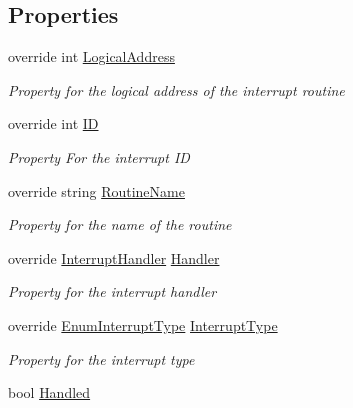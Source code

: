 \subsection*{Properties}
\begin{DoxyCompactItemize}
\item 
override int \hyperlink{class_c_p_u___o_s___simulator_1_1_c_p_u_1_1_interrupts_1_1_vectored_interrupt_aabc866e723b3484d03f7a5eac790a3ce}{Logical\+Address}
\begin{DoxyCompactList}\small\item\em Property for the logical address of the interrupt routine \end{DoxyCompactList}\item 
override int \hyperlink{class_c_p_u___o_s___simulator_1_1_c_p_u_1_1_interrupts_1_1_vectored_interrupt_ae6afd6b3fba35d485a7504737ff90d23}{I\+D}
\begin{DoxyCompactList}\small\item\em Property For the interrupt I\+D \end{DoxyCompactList}\item 
override string \hyperlink{class_c_p_u___o_s___simulator_1_1_c_p_u_1_1_interrupts_1_1_vectored_interrupt_adf0b02aced85f32cec631b946a6d024d}{Routine\+Name}
\begin{DoxyCompactList}\small\item\em Property for the name of the routine \end{DoxyCompactList}\item 
override \hyperlink{class_c_p_u___o_s___simulator_1_1_c_p_u_1_1_interrupts_1_1_interrupt_handler}{Interrupt\+Handler} \hyperlink{class_c_p_u___o_s___simulator_1_1_c_p_u_1_1_interrupts_1_1_vectored_interrupt_a0eb71f1e9f97cd4730fc8382e4ff8843}{Handler}
\begin{DoxyCompactList}\small\item\em Property for the interrupt handler \end{DoxyCompactList}\item 
override \hyperlink{namespace_c_p_u___o_s___simulator_1_1_c_p_u_1_1_interrupts_a575a43213ed6d54083da8956c5a69b39}{Enum\+Interrupt\+Type} \hyperlink{class_c_p_u___o_s___simulator_1_1_c_p_u_1_1_interrupts_1_1_vectored_interrupt_a736eef5408e4def861c191fb27c04765}{Interrupt\+Type}
\begin{DoxyCompactList}\small\item\em Property for the interrupt type \end{DoxyCompactList}\item 
bool \hyperlink{class_c_p_u___o_s___simulator_1_1_c_p_u_1_1_interrupts_1_1_vectored_interrupt_a8bcab1441436677d0e85f1e393368417}{Handled}
\end{DoxyCompactItemize}
